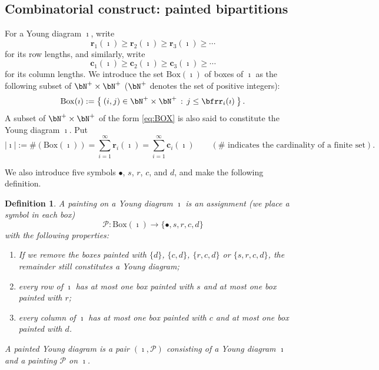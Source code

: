 \documentclass[11pt,a4paper]{amsart}
\def\abs#1{\left|{#1}\right|}
\newcommand{\CP}{{\mathcal {P}}}
\numberwithin{equation}{section}
\newtheorem{defn}[thm]{Definition}
\theoremstyle{remark}
\def\BOX{\mathrm{Box}}
\begin{document}
\subsection{Combinatorial construct: painted bipartitions}
\label{sec:PB}

For a Young diagram $\imath$, write
\[
 \mathbf r_1(\imath)\geq \mathbf r_2(\imath)\geq \mathbf r_3(\imath)\geq \cdots
\]
for its row lengths, and similarly,
write
\[
 \mathbf c_1(\imath)\geq \mathbf c_2(\imath)\geq \mathbf c_3(\imath)\geq \cdots
\]
for its column lengths.
We introduce the set $\BOX(\imath)$ of boxes of $\imath$ as the following subset
of $\bN^+\times \bN^+$ ($\bN^+$ denotes the set of positive integers):
\begin{equation}\label{eq:BOX}
\BOX(\imath):=\Set{(i,j)\in\bN^+\times \bN^+ \,:\, j\leq \bfrr_i(\imath)}.
\end{equation}
A subset of $\bN^+\times \bN^+$ of the form \eqref{eq:BOX} is also said to constitute the Young diagram $\imath$. Put
\begin{equation}\label{eq:BOX22}
\abs{\imath}:=\#(\BOX(\imath))=\sum_{i=1}^\infty \mathbf r_i(\imath)=\sum_{i=1}^\infty \mathbf c_i(\imath)\qquad (\textrm{$\#$ indicates the cardinality of a finite set}).
\end{equation}

We also introduce five symbols $\bullet$, $s$, $r$, $c$, and $d$, and make the following definition.

\begin{defn}
A painting on a Young diagram $\imath$ is an assignment (we
    place a symbol in each box)
  \[
    \mathcal P: \mathrm{Box}(\imath) \rightarrow \{\bullet, s, r, c, d \}
  \]
  with the following properties:
  \begin{enumerate}
  \item If we remove the boxes painted with $\{d\}$,
$\{c,d\}$, $\{r,c,d\}$ or $\{s,r,c,d\}$, the remainder still constitutes a Young diagram;
    \item every row of $\imath$ has at most one box
          painted with $s$ and at most one box painted with $r$;
    \item every column of $\imath$ has at most one
          box painted with $c$ and at most one box painted with $d$.
  \end{enumerate}
A painted Young diagram is a pair $(\imath, \CP)$ consisting of a Young diagram $\imath$ and a painting $\CP$ on $\imath$.
\end{defn}
\end{document}
